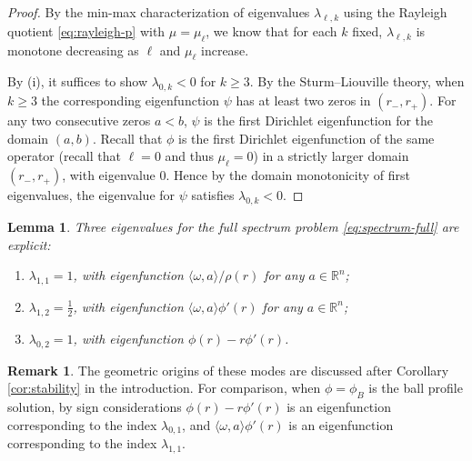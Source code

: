 \documentclass[11pt]{article}
\numberwithin{equation}{section}
\newtheorem{lemma}[theorem]{Lemma}
\theoremstyle{definition}
\newtheorem*{remark}{Remark}
\newcommand{\RR}{\mathbb{R}}
\begin{document}
\begin{proof}
By the min-max characterization of eigenvalues $\lambda_{\ell,k}$ using the Rayleigh quotient \eqref{eq:rayleigh-p} with $\mu=\mu_\ell$, we know that for each $k$ fixed, $\lambda_{\ell,k}$ is monotone decreasing as $\ell$ and $\mu_{\ell}$ increase.

By (i), it suffices to show $\lambda_{0,k}<0$ for $k\geq3$.
By the Sturm--Liouville theory, when $k\geq 3$ the corresponding eigenfunction $\psi$ has at least two zeros in $(r_-,r_+)$. For any two consecutive zeros $a<b$, $\psi$ is the first Dirichlet eigenfunction for the domain $(a,b)$. Recall that $\phi$ is the first Dirichlet eigenfunction of the same operator (recall that $\ell=0$ and thus $\mu_\ell=0$) in a strictly larger domain $(r_-,r_+)$, with eigenvalue $0$. Hence by the domain monotonicity of first eigenvalues, the eigenvalue for $\psi$ satisfies $\lambda_{0,k} < 0$.
\end{proof}


\begin{lemma}\label{lem:explicit-modes}
Three eigenvalues for the full spectrum problem \eqref{eq:spectrum-full} are explicit:
\begin{enumerate}[label=\textup{(\roman*)}]
\item $\lambda_{1,1}=1$, with eigenfunction $\langle \omega, a \rangle/\rho(r)$ for any $a\in \RR^n$; 
\item $\lambda_{1,2}=\frac12$, with eigenfunction $\langle \omega, a \rangle \phi'(r)$ for any $a\in \RR^n$; 
\item $\lambda_{0,2}=1$, with eigenfunction $\phi(r)-r\phi'(r)$.
\end{enumerate}
\end{lemma}

\begin{remark}\label{rem:geometric-modes}
The geometric origins of these modes are discussed after Corollary \ref{cor:stability} in the introduction. For comparison, when $\phi= \phi_B$ is the ball profile solution, by sign considerations $\phi(r)-r\phi'(r)$ is an eigenfunction corresponding to the index $\lambda_{0,1}$, and $\langle \omega, a \rangle \phi'(r)$ is an eigenfunction corresponding to the index $\lambda_{1,1}$.
\end{remark}
\end{document}

